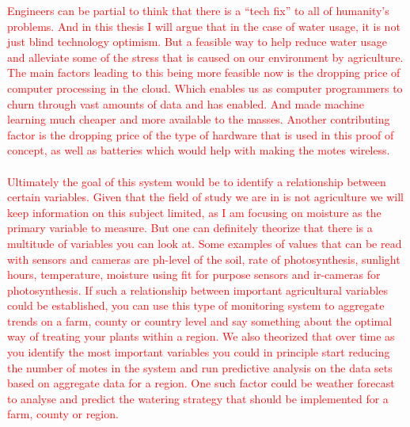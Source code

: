 \documentclass[]{uiophd}
\begin{document}
\textcolor{red}{Engineers can be partial to think that there is a “tech fix” to all of humanity's problems. And in this thesis I will argue that in the case of water usage, it is not just blind technology optimism. But a feasible way to help reduce water usage and alleviate some of the stress that is caused on our environment by agriculture. The main factors leading to this being more feasible now is the dropping price of computer processing in the cloud. Which enables us as computer programmers to churn through vast amounts of data and has enabled. And made machine learning much cheaper and more available to the masses. Another contributing factor is the dropping price of the type of hardware that is used in this proof of concept, as well as batteries which would help with making the motes wireless.
\\\\
Ultimately the goal of this system would be to identify a relationship between certain variables.  Given that the field of study we are in is not agriculture we will keep information on this subject limited, as I am focusing on moisture as the primary variable to measure. But one can definitely theorize that there is a multitude of variables you can look at. Some examples of values that can be read with sensors and cameras are ph-level of the soil, rate of photosynthesis, sunlight hours, temperature, moisture using fit for purpose sensors and ir-cameras for photosynthesis. If such a relationship between important agricultural variables could be established, you can use this type of monitoring system to aggregate trends on a farm, county or country level and say something about the optimal way of treating your plants within a region. We also theorized that over time as you identify the most important variables you could in principle start reducing the number of motes in the system and run predictive analysis on the data sets based on aggregate data for a region. One such factor could be weather forecast to analyse and predict the watering strategy that should be implemented for a farm, county or region. }
\end{document}
